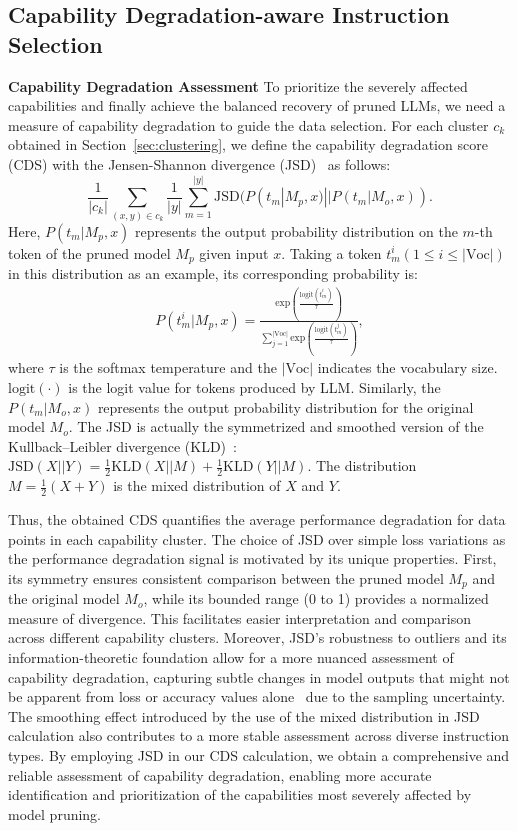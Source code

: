 \subsection{Capability Degradation-aware Instruction Selection}
\textbf{Capability Degradation Assessment} To prioritize the severely affected capabilities and finally achieve the balanced recovery of pruned LLMs, we need a measure of capability degradation to guide the data selection. For each cluster $c_k$ obtained in Section~\ref{sec:clustering}, we define the capability degradation score (CDS)  with the Jensen-Shannon divergence (JSD)~\citep{fuglede2004jensen} as follows:
\begin{equation}
\frac{1}{|c_k|} \sum_{(x,y) \in c_k} \frac{1}{|y|}\sum_{m=1}^{|y|}\text{JSD}(P(t_m|M_p, x)||P(t_m|M_o, x)).   
\end{equation}
Here, $P(t_m|M_p, x)$ represents the output probability distribution on the $m$-th token of the pruned model $M_p$ given input $x$. Taking a token $t^i_m (1 \leq i \leq |\text{Voc}|)$ in this distribution as an example, its corresponding probability is:
\begin{equation}
\begin{aligned}
      P(t^i_m|M_p, x) = \frac{\text{exp}(\frac{\text{logit}(t^i_m)}{\tau})}{\sum^{|\text{Voc}|}_{j=1} \text{exp}(\frac{\text{logit}(t^j_m)}{\tau})},
\end{aligned}
\end{equation}
where $\tau$ is the softmax temperature and the $|\text{Voc}|$ indicates the vocabulary size. $\text{logit}(\cdot)$ is the logit value for tokens produced by LLM.
Similarly, the $P(t_m|M_o, x)$ represents the output probability distribution for the original model $M_o$. The JSD is actually the symmetrized and smoothed version of the Kullback–Leibler divergence (KLD)~\citep{kullback1951information}: $\text{JSD}(X||Y) = \frac{1}{2} \text{KLD}(X||M) + \frac{1}{2} \text{KLD}(Y||M)$. The distribution $M=\frac{1}{2}(X+Y)$ is the mixed distribution of $X$ and $Y$.


Thus, the obtained CDS quantifies the average performance degradation for data points in each capability cluster. The choice of JSD over simple loss variations as the performance degradation signal is motivated by its unique properties. First, its symmetry ensures consistent comparison between the pruned model $M_p$ and the original model $M_o$, while its bounded range (0 to 1) provides a normalized measure of divergence. This facilitates easier interpretation and comparison across different capability clusters. Moreover, JSD's robustness to outliers and its information-theoretic foundation allow for a more nuanced assessment of capability degradation, capturing subtle changes in model outputs that might not be apparent from loss or accuracy values alone~\citep{dutta2024accuracy} due to the sampling uncertainty. The smoothing effect introduced by the use of the mixed distribution in JSD calculation also contributes to a more stable assessment across diverse instruction types. By employing JSD in our CDS calculation, we obtain a comprehensive and reliable assessment of capability degradation, enabling more accurate identification and prioritization of the capabilities most severely affected by model pruning.

